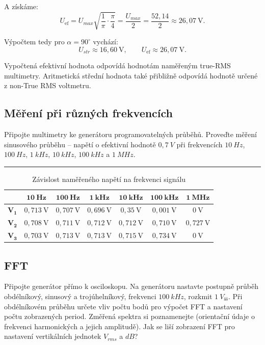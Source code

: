 \documentclass[a4paper,12pt]{article}
\begin{document}
A získáme:
$$
U_{\mathrm{ef}} =
U_{max}\sqrt{\frac{1}{\pi}\cdot\frac{\pi}{4}}
=
\frac{U_{max}}{2}
=
\frac{52{,}14}{2}
\approx 26{,}07\ \mathrm{V}.
$$

Výpočtem tedy pro $\alpha = 90^\circ$ vychází:
$$
U_{str} \approx 16{,}60\ \mathrm{V},
\qquad
U_{\mathrm{ef}} \approx 26{,}07\ \mathrm{V}.
$$

Vypočtená efektivní hodnota odpovídá hodnotám naměřeným true-RMS multimetry. Aritmetická střední hodnota také přibližně odpovídá hodnotě určené z non-True RMS voltmetru.

\subsection{Měření při různých frekvencích}
Připojte multimetry ke generátoru programovatelných průběhů. Proveďte měření sinusového průběhu -- napětí o efektivní hodnotě $0,7\ V$ při frekvencích $10\ Hz$, $100\ Hz$, $1\ kHz$, $10\ kHz$, $100\ kHz$ a $1\ MHz$.
\par\noindent\rule{\textwidth}{0.4pt}

\begin{table}[H]
\centering
\begin{tabular}{|c|c|c|c|c|c|c|}
\hline
 & $\mathbf{10\ Hz}$ & $\mathbf{100\ Hz}$ & $\mathbf{1\ kHz}$ & $\mathbf{10\ kHz}$ & $\mathbf{100\ kHz}$ & $\mathbf{1\ MHz}$ \\
\hline
$\mathbf{V_1}$ & $0{,}713\ \mathrm{V}$ & $0{,}707\ \mathrm{V}$ & $0{,}696\ \mathrm{V}$ & $0{,}35\ \mathrm{V}$ & $0{,}001\ \mathrm{V}$ & $0\ \mathrm{V}$ \\
\hline
$\mathbf{V_2}$ & $0{,}708\ \mathrm{V}$ & $0{,}711\ \mathrm{V}$ & $0{,}712\ \mathrm{V}$ & $0{,}712\ \mathrm{V}$ & $0{,}710\ \mathrm{V}$ & $0{,}727\ \mathrm{V}$ \\
\hline
$\mathbf{V_3}$ & $0{,}703\ \mathrm{V}$ & $0{,}713\ \mathrm{V}$ & $0{,}713\ \mathrm{V}$ & $0{,}715\ \mathrm{V}$ & $0{,}734\ \mathrm{V}$ & $0\ \mathrm{V}$ \\
\hline
\end{tabular}
\caption{Závislost naměřeného napětí na frekvenci signálu}
\end{table}

\subsection{FFT}
Připojte generátor přímo k osciloskopu. Na generátoru nastavte postupně průběh obdélníkový, sinusový a trojúhelníkový, frekvenci $100\ kHz$, rozkmit $1\ V_{šš}$. Při obdélníkovém průběhu určete vliv počtu bodů pro
výpočet FFT a nastavení počtu zobrazených period. Změřená spektra si poznamenejte (orientační údaje o
frekvenci harmonických a jejich amplitudě). Jak se liší zobrazení FFT pro nastavení vertikálních
jednotek $V_{rms}$ a $dB$?
\end{document}
